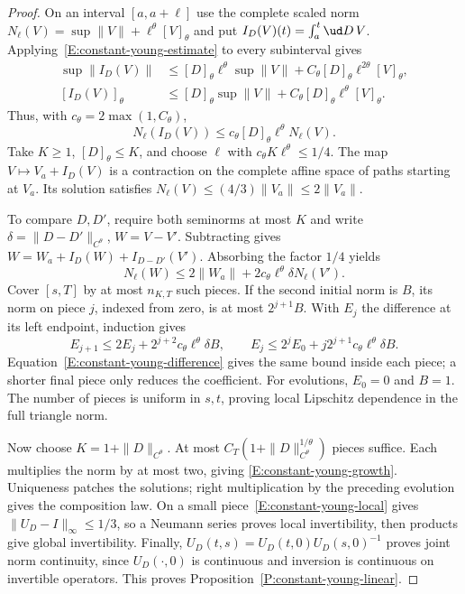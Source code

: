 \begin{proof}
  On an interval $[a,a+\ell]$ use the complete scaled norm
  $N_\ell(V)=\sup\|V\|+\ell^\theta[V]_\theta$ and put
  $I_D(V)(t)=\int_a^t\ud D\,V$.
  Applying~\eqref{E:constant-young-estimate} to every subinterval gives
  \begin{align*}
    \sup\|I_D(V)\|
    &\le[D]_\theta\ell^\theta\sup\|V\|
    +C_\theta[D]_\theta\ell^{2\theta}[V]_\theta,\\
    [I_D(V)]_\theta
    &\le[D]_\theta\sup\|V\|
    +C_\theta[D]_\theta\ell^\theta[V]_\theta.
  \end{align*}
  Thus, with $c_\theta=2\max(1,C_\theta)$,
  \begin{equation}\label{E:constant-young-local}
    N_\ell(I_D(V))
    \le c_\theta[D]_\theta\ell^\theta N_\ell(V).
  \end{equation}
  Take $K\ge1$, $[D]_\theta\le K$, and choose $\ell$ with
  $c_\theta K\ell^\theta\le1/4$. The map
  $V\mapsto V_a+I_D(V)$ is a contraction on the complete affine
  space of paths starting at $V_a$. Its solution satisfies
  $N_\ell(V)\le(4/3)\|V_a\|\le2\|V_a\|$.

  To compare $D,D'$, require both seminorms at most $K$ and write
  $\delta=\|D-D'\|_{C^\theta}$, $W=V-V'$. Subtracting gives
  $W=W_a+I_D(W)+I_{D-D'}(V')$. Absorbing the factor $1/4$ yields
  \begin{equation}\label{E:constant-young-difference}
    N_\ell(W)\le2\|W_a\|
    +2c_\theta\ell^\theta\delta N_\ell(V').
  \end{equation}
  Cover $[s,T]$ by at most $n_{K,T}$ such pieces. If the second
  initial norm is $B$, its norm on piece $j$, indexed from zero,
  is at most $2^{j+1}B$. With $E_j$ the difference at its left
  endpoint, induction gives
  \[
    E_{j+1}\le2E_j+2^{j+2}c_\theta\ell^\theta\delta B,\qquad
    E_j\le2^jE_0+j2^{j+1}c_\theta\ell^\theta\delta B.
  \]
  Equation~\eqref{E:constant-young-difference} gives the same bound
  inside each piece; a shorter final piece only reduces the coefficient.
  For evolutions, $E_0=0$ and $B=1$. The number of pieces is uniform
  in $s,t$, proving local Lipschitz dependence in the full triangle norm.

  Now choose $K=1+\|D\|_{C^\theta}$. At most
  $C_T(1+\|D\|_{C^\theta}^{1/\theta})$ pieces suffice.
  Each multiplies the norm by at most two, giving
  \eqref{E:constant-young-growth}. Uniqueness patches the solutions;
  right multiplication by the preceding evolution gives the
  composition law. On a small piece~\eqref{E:constant-young-local}
  gives $\|U_D-I\|_\infty\le1/3$, so a Neumann series proves local
  invertibility, then products give global invertibility.
  Finally, $U_D(t,s)=U_D(t,0)U_D(s,0)^{-1}$ proves joint norm
  continuity, since $U_D(\cdot,0)$ is continuous and inversion is
  continuous on invertible operators.
  This proves Proposition~\ref{P:constant-young-linear}.
\end{proof}

